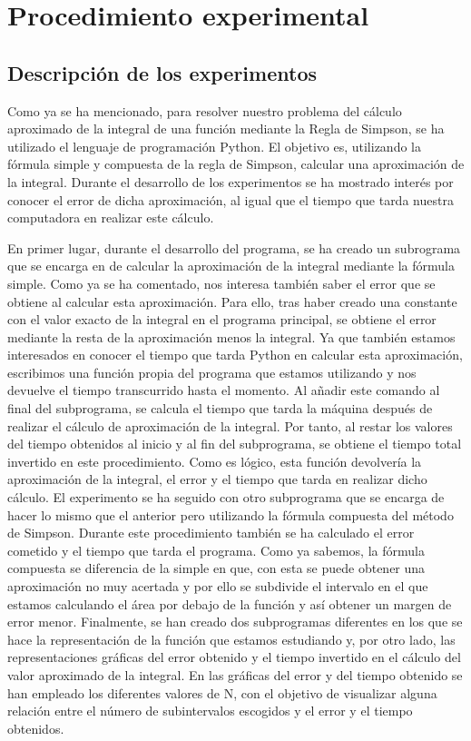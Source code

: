 \documentclass[spanish,a4paper,11pt]{report}
\begin{document}
\chapter{Procedimiento experimental}

\section{Descripción de los experimentos}    
\label{chapter:exp} 

Como ya se ha mencionado, para resolver nuestro problema del cálculo aproximado de la integral de una función mediante la Regla 
de Simpson, se ha utilizado el lenguaje de programación Python.
El objetivo es, utilizando la fórmula simple y compuesta de la regla de Simpson, calcular una aproximación de la integral. Durante
el desarrollo de los experimentos se ha mostrado interés por conocer el error de dicha aproximación, al igual que el tiempo que tarda nuestra computadora en realizar este cálculo.\par
En primer lugar, durante el desarrollo del programa, se ha creado un subrograma que se encarga en de calcular la aproximación de
la integral mediante la fórmula simple. Como ya se ha comentado, nos interesa también saber el error que se obtiene al calcular 
esta aproximación. Para ello, tras haber creado una constante con el valor exacto de la integral en el programa principal, se obtiene
el error mediante la resta de la aproximación menos la integral. Ya que también estamos interesados en conocer el tiempo que tarda
Python en calcular esta aproximación, escribimos una función propia del programa que estamos utilizando y nos devuelve el tiempo
transcurrido hasta el momento. Al añadir este comando al final del subprograma, se calcula el tiempo que tarda la máquina después 
de realizar el cálculo de aproximación de la integral. Por tanto, al restar los valores del tiempo obtenidos al inicio y al fin 
del subprograma, se obtiene el tiempo total invertido en este procedimiento. Como es lógico, esta función devolvería la aproximación
de la integral, el error y el tiempo que tarda en realizar dicho cálculo.\parindent=1cm
El experimento se ha seguido con otro subprograma que se encarga de hacer lo mismo que el anterior pero utilizando la fórmula 
compuesta del método de Simpson. Durante este procedimiento también se ha calculado el error cometido y el tiempo que tarda el 
programa. Como ya sabemos, la fórmula compuesta se diferencia de la simple en que, con esta se puede obtener una 
aproximación no muy acertada y por ello se subdivide el intervalo en el que estamos calculando el área por debajo de la función y
así obtener un margen de error menor. 
Finalmente, se han creado dos subprogramas diferentes en los que se hace la representación de la función que estamos estudiando y,
por otro lado, las representaciones gráficas del error obtenido y el tiempo invertido en el cálculo del valor aproximado de la 
integral. En las gráficas del error y del tiempo obtenido se han empleado los diferentes valores de N, con el objetivo de 
visualizar alguna relación entre el número de subintervalos escogidos y el error y el tiempo obtenidos.
\end{document}
